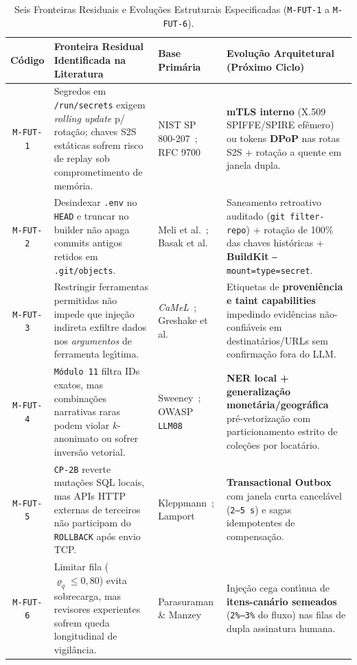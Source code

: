 \documentclass[10pt,twocolumn]{article}
\begin{document}
\begin{table}[t]
\centering
\caption{Seis Fronteiras Residuais e Evolu\c{c}\~{o}es Estruturais Especificadas (\texttt{M-FUT-1} a \texttt{M-FUT-6}).}
\label{tab:mfut_pt}
\footnotesize
\begin{tabularx}{\textwidth}{@{}c Y l Y@{}}
\toprule
\textbf{C\'{o}digo} & \textbf{Fronteira Residual Identificada na Literatura} & \textbf{Base Prim\'{a}ria} & \textbf{Evolu\c{c}\~{a}o Arquitetural (Pr\'{o}ximo Ciclo)} \\
\midrule
\texttt{M-FUT-1} & Segredos em \texttt{/run/secrets} exigem \emph{rolling update} p/ rota\c{c}\~{a}o; chaves S2S est\'{a}ticas sofrem risco de replay sob comprometimento de mem\'{o}ria. & NIST SP 800-207~\cite{R16}; RFC 9700~\cite{R28} & \textbf{mTLS interno} (X.509 SPIFFE/SPIRE ef\^{e}mero) ou tokens \textbf{DPoP} nas rotas S2S + rota\c{c}\~{a}o a quente em janela dupla. \\
\addlinespace[2pt]
\texttt{M-FUT-2} & Desindexar \texttt{.env} no \texttt{HEAD} e truncar no builder n\~{a}o apaga commits antigos retidos em \texttt{.git/objects}. & Meli et al.~\cite{R15}; Basak et al.~\cite{R20} & Saneamento retroativo auditado (\texttt{git filter-repo}) + rota\c{c}\~{a}o de 100\% das chaves hist\'{o}ricas + \textbf{BuildKit} \texttt{--mount=type=secret}. \\
\addlinespace[2pt]
\texttt{M-FUT-3} & Restringir ferramentas permitidas n\~{a}o impede que inje\c{c}\~{a}o indireta exfiltre dados nos \emph{argumentos} de ferramenta leg\'{\i}tima. & \emph{CaMeL}~\cite{R27}; Greshake et al.~\cite{R22} & Etiquetas de \textbf{proveni\^{e}ncia e taint capabilities} impedindo evid\^{e}ncias n\~{a}o-confi\'{a}veis em destinat\'{a}rios/URLs sem confirma\c{c}\~{a}o fora do LLM. \\
\addlinespace[2pt]
\texttt{M-FUT-4} & \texttt{M\'{o}dulo 11} filtra IDs exatos, mas combina\c{c}\~{o}es narrativas raras podem violar $k$-anonimato ou sofrer invers\~{a}o vetorial. & Sweeney~\cite{R07}; OWASP \texttt{LLM08}~\cite{R29} & \textbf{NER local + generaliza\c{c}\~{a}o monet\'{a}ria/geogr\'{a}fica} pr\'{e}-vetoriza\c{c}\~{a}o com particionamento estrito de cole\c{c}\~{o}es por locat\'{a}rio. \\
\addlinespace[2pt]
\texttt{M-FUT-5} & \texttt{CP-2B} reverte muta\c{c}\~{o}es SQL locais, mas APIs HTTP externas de terceiros n\~{a}o participam do \texttt{ROLLBACK} ap\'{o}s envio TCP. & Kleppmann~\cite{R13}; Lamport~\cite{R03} & \textbf{Transactional Outbox} com janela curta cancel\'{a}vel (\texttt{2--5 s}) e sagas idempotentes de compensa\c{c}\~{a}o. \\
\addlinespace[2pt]
\texttt{M-FUT-6} & Limitar fila ($\varrho_q \le 0,80$) evita sobrecarga, mas revisores experientes sofrem queda longitudinal de vigil\^{a}ncia. & Parasuraman \& Manzey~\cite{R08} & Inje\c{c}\~{a}o cega cont\'{\i}nua de \textbf{itens-can\'{a}rio semeados} (\texttt{2\%--3\%} do fluxo) nas filas de dupla assinatura humana. \\
\bottomrule
\end{tabularx}
\end{table}
\end{document}
